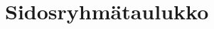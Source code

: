 \chapter{Sidosryhmätaulukko}

\begin{landscape}
\begin{table}[]
\label{tab:sidosryhmataulukko}
\end{table}
\end{landscape}
